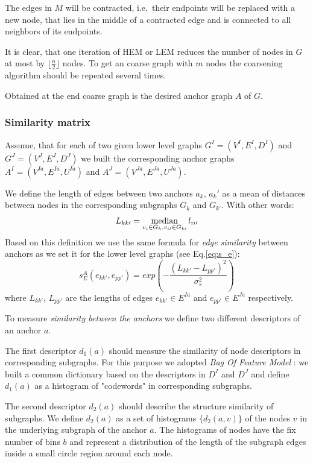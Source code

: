 The edges in $M$ will be contracted, i.e.\ their endpoints will be replaced with a new node, that lies in the middle of a contracted edge and is connected to all neighbors of its endpoints.

It is clear, that one iteration of HEM or LEM reduces the number of nodes in $G$ at most by $\lfloor\frac{n}{2} \rfloor$ nodes. To get an coarse graph with $m$ nodes the coarsening algorithm should be repeated several times.

Obtained at the end coarse graph is the desired anchor graph $A$ of $G$. 

\subsubsection{Similarity matrix}

Assume, that for each of two given lower level graphs $G^I = (V^I, E^I, D^I)$ and $G^J=(V^J, E^J, D^J)$ we built the corresponding anchor graphs  $A^I=(V^{Ia},E^{Ia}, U^{Ia})$ and $A^J=(V^{Ja},E^{Ja},U^{Ja})$. 

We define the length of edges between two anchors $a_k$, $a_k\prime$ as a mean of distances between nodes in the corresponding subgraphs $G_k$ and $G_{k\prime}$. With other words:
\begin{equation} L_{kk\prime} = \mathop{\rm median}_{v_i\in G_k, v_{i\prime}\in G_{k\prime}} l_{ii\prime} \end{equation}
Based on this definition we use the same formula for \emph{edge similarity} between anchors as we set it for the lower level graphs (see Eq.\ref{eq:s_e}):
\begin{equation} 
s^A_E(e_{kk\prime}, e_{pp\prime}) = exp(-\frac{(L_{kk\prime} - L_{pp\prime})^2}{\sigma^2_{s}})
\label{eq:s_e_A}
\end{equation}
where $L_{kk\prime}$, $L_{pp\prime} $ are the lengths of edges $e_{kk\prime}\in E^{Ia}$ and $e_{pp\prime}\in E^{Ja}$ respectively.

To measure \emph{similarity between the anchors} we  define two different descriptors of an anchor $a$.

The first descriptor $d_1(a)$ should measure the similarity of node descriptors in corresponding subgraphs. For this purpose we adopted \emph{Bag Of Feature Model} : we built a common dictionary based on the descriptors in $D^I$ and $D^J$ and define $d_1(a)$ as a histogram of "codewords" in corresponding subgraphs.

The second descriptor $d_2(a)$ should describe the structure similarity of subgraphs. We define $d_2(a)$ as a set of histograms $\{d_2(a,v)\}$ of the nodes $v$ in the underlying subgraph of the anchor $a$. The histograms of nodes have the fix number of bins $b$ and represent a distribution of the length of the subgraph edges inside a small circle region around each node. 

